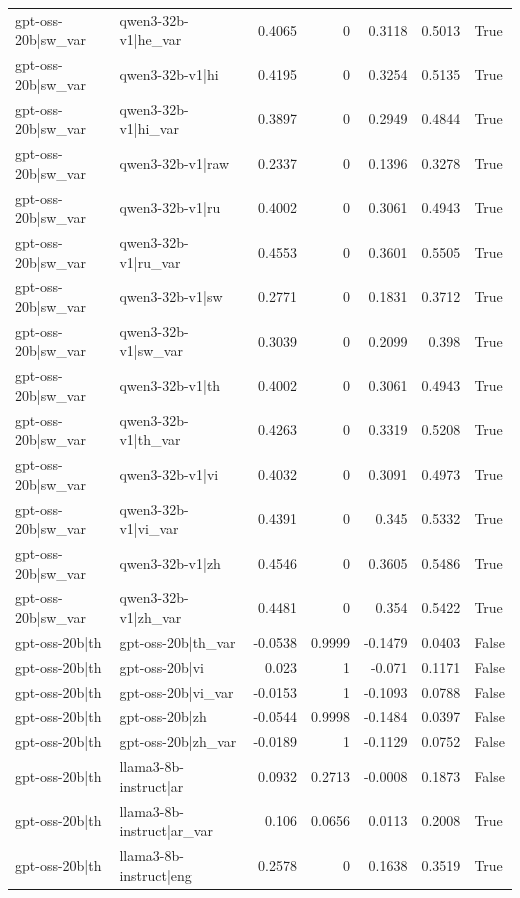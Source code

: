 \begin{table}
\begin{tabular}{l l r r r r l}
gpt-oss-20b|sw_var & qwen3-32b-v1|he_var & 0.4065 & 0 & 0.3118 & 0.5013 & True \\
gpt-oss-20b|sw_var & qwen3-32b-v1|hi & 0.4195 & 0 & 0.3254 & 0.5135 & True \\
gpt-oss-20b|sw_var & qwen3-32b-v1|hi_var & 0.3897 & 0 & 0.2949 & 0.4844 & True \\
gpt-oss-20b|sw_var & qwen3-32b-v1|raw & 0.2337 & 0 & 0.1396 & 0.3278 & True \\
gpt-oss-20b|sw_var & qwen3-32b-v1|ru & 0.4002 & 0 & 0.3061 & 0.4943 & True \\
gpt-oss-20b|sw_var & qwen3-32b-v1|ru_var & 0.4553 & 0 & 0.3601 & 0.5505 & True \\
gpt-oss-20b|sw_var & qwen3-32b-v1|sw & 0.2771 & 0 & 0.1831 & 0.3712 & True \\
gpt-oss-20b|sw_var & qwen3-32b-v1|sw_var & 0.3039 & 0 & 0.2099 & 0.398 & True \\
gpt-oss-20b|sw_var & qwen3-32b-v1|th & 0.4002 & 0 & 0.3061 & 0.4943 & True \\
gpt-oss-20b|sw_var & qwen3-32b-v1|th_var & 0.4263 & 0 & 0.3319 & 0.5208 & True \\
gpt-oss-20b|sw_var & qwen3-32b-v1|vi & 0.4032 & 0 & 0.3091 & 0.4973 & True \\
gpt-oss-20b|sw_var & qwen3-32b-v1|vi_var & 0.4391 & 0 & 0.345 & 0.5332 & True \\
gpt-oss-20b|sw_var & qwen3-32b-v1|zh & 0.4546 & 0 & 0.3605 & 0.5486 & True \\
gpt-oss-20b|sw_var & qwen3-32b-v1|zh_var & 0.4481 & 0 & 0.354 & 0.5422 & True \\
gpt-oss-20b|th & gpt-oss-20b|th_var & -0.0538 & 0.9999 & -0.1479 & 0.0403 & False \\
gpt-oss-20b|th & gpt-oss-20b|vi & 0.023 & 1 & -0.071 & 0.1171 & False \\
gpt-oss-20b|th & gpt-oss-20b|vi_var & -0.0153 & 1 & -0.1093 & 0.0788 & False \\
gpt-oss-20b|th & gpt-oss-20b|zh & -0.0544 & 0.9998 & -0.1484 & 0.0397 & False \\
gpt-oss-20b|th & gpt-oss-20b|zh_var & -0.0189 & 1 & -0.1129 & 0.0752 & False \\
gpt-oss-20b|th & llama3-8b-instruct|ar & 0.0932 & 0.2713 & -0.0008 & 0.1873 & False \\
gpt-oss-20b|th & llama3-8b-instruct|ar_var & 0.106 & 0.0656 & 0.0113 & 0.2008 & True \\
gpt-oss-20b|th & llama3-8b-instruct|eng & 0.2578 & 0 & 0.1638 & 0.3519 & True \\

\end{tabular}
\end{table}

